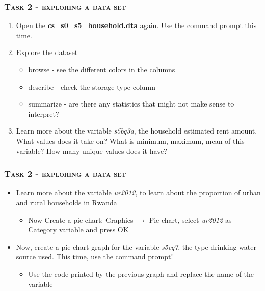 \documentclass[10pt]{beamer}
\begin{document}
	\begin{frame}
		\frametitle{\textsc{Task 2 - exploring a data set}}
		\begin{enumerate}
			 \item Open the \textbf{cs\_s0\_s5\_household.dta} again. Use the command prompt this time.
			\onslide<2-> \item Explore the dataset
			\begin{itemize}
				\item browse - see the different colors in the columns
				\item describe - check the storage type column
				\item summarize - are there any statistics that might not make sense to interpret?
			\end{itemize}
			\item Learn more about the variable \textit{s5bq3a}, the household estimated rent amount. What values does it take on? What is minimum, maximum, mean of this variable? How many unique values does it have?
		\end{enumerate}
		
\begin{stlog}\end{stlog}
		\end{frame}

	\begin{frame}
		\frametitle{\textsc{Task 2 - exploring a data set}}

		\begin{itemize}
			\item Learn more about the variable \textit{ur2012}, to learn about the proportion of urban and rural households in Rwanda
	
			
\begin{stlog}\end{stlog}
		\begin{itemize}
				\item Now Create a pie chart: Graphics $\rightarrow$ Pie chart, select \textit{ur2012} as Category variable and press OK
			\end{itemize}
		 \item Now, create a pie-chart graph for the variable \textit{s5cq7}, the type drinking water source used. This time, use the command prompt!
			\begin{itemize}
				\item Use the code printed by the previous graph and replace the name of the variable
			\end{itemize}

		\end{itemize}
	\end{frame}
\end{document}
